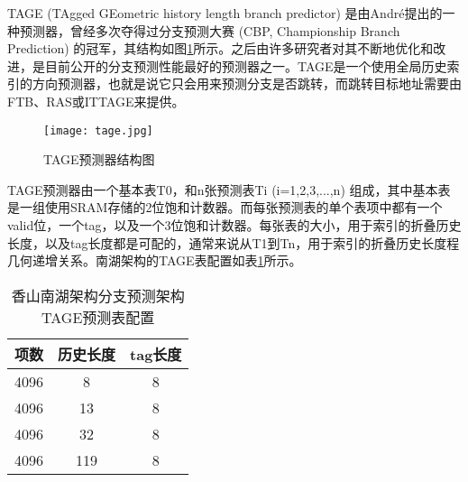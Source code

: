 TAGE (TAgged GEometric history length branch predictor) 是由André提出的一种预测器\cite{tage}，曾经多次夺得过分支预测大赛 (CBP, Championship Branch Prediction) 的冠军，其结构如图\ref{fig:figure23}所示。之后由许多研究者对其不断地优化和改进，是目前公开的分支预测性能最好的预测器之一。TAGE是一个使用全局历史索引的方向预测器，也就是说它只会用来预测分支是否跳转，而跳转目标地址需要由FTB、RAS或ITTAGE来提供。


\begin{figure}[htb]
	\centering
	\setlength\tabcolsep{3pt}  %
	\vspace{5pt} %
	\texttt{[image: tage.jpg]}
	\caption{TAGE预测器结构图}
	\label{fig:figure23}
\end{figure}

TAGE预测器由一个基本表T0，和n张预测表Ti (i=1,2,3,...,n) 组成，其中基本表是一组使用SRAM存储的2位饱和计数器。而每张预测表的单个表项中都有一个valid位，一个tag，以及一个3位饱和计数器。每张表的大小，用于索引的折叠历史长度，以及tag长度都是可配的，通常来说从T1到Tn，用于索引的折叠历史长度程几何递增关系。南湖架构的TAGE表配置如表\ref{tb:table21}所示。


\begin{table}[]
	\caption{香山南湖架构分支预测架构TAGE预测表配置}
	\label{tb:table21}
	\centering
    \begin{tabular}{ccc}
        \toprule
        项数 & 历史长度 & tag长度 \\
        \midrule
        4096 & 8 & 8 \\
        4096 & 13 & 8 \\
        4096 & 32 & 8 \\
		4096 & 119 & 8 \\
        \bottomrule
    \end{tabular}
\end{table}

